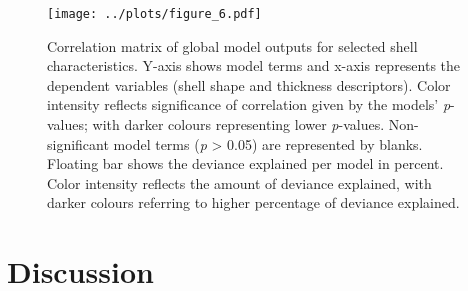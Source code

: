 \documentclass[smallextended]{svjour3}       %
\begin{document}
\begin{figure}
\centering
\texttt{[image: ../plots/figure\_6.pdf]}
\caption{Correlation matrix of global model outputs for selected shell
characteristics. Y-axis shows model terms and x-axis represents the
dependent variables (shell shape and thickness descriptors). Color
intensity reflects significance of correlation given by the models'
\emph{p}-values; with darker colours representing lower \emph{p}-values.
Non-significant model terms (\emph{p} \textgreater{} 0.05) are
represented by blanks. Floating bar shows the deviance explained per
model in percent. Color intensity reflects the amount of deviance
explained, with darker colours referring to higher percentage of
deviance explained.}
\end{figure}

\hypertarget{discussion}{%
\section{Discussion}\label{discussion}}
\end{document}
